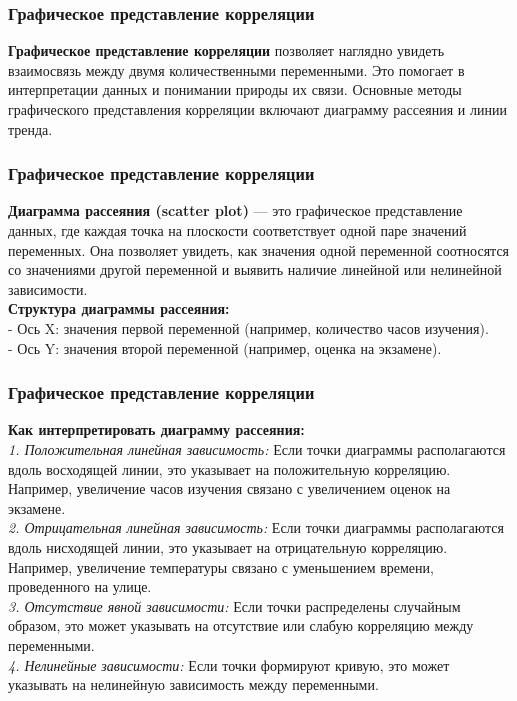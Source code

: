 \documentclass[aspectratio=169]{beamer}
\begin{document}
\begin{frame}
\frametitle{Графическое представление корреляции}
{\bf Графическое представление корреляции} позволяет наглядно увидеть взаимосвязь между двумя количественными переменными. Это помогает в интерпретации данных и понимании природы их связи. Основные методы графического представления корреляции включают диаграмму рассеяния и линии тренда.
\end{frame}

\begin{frame}
\frametitle{Графическое представление корреляции}
{\bf Диаграмма рассеяния (scatter plot)} — это графическое представление данных, где каждая точка на плоскости соответствует одной паре значений переменных. Она позволяет увидеть, как значения одной переменной соотносятся со значениями другой переменной и выявить наличие линейной или нелинейной зависимости.
\newline\\
{\bf Структура диаграммы рассеяния:}\\
\quad - Ось X: значения первой переменной (например, количество часов изучения).\\
\quad - Ось Y: значения второй переменной (например, оценка на экзамене).
\end{frame}

\begin{frame}
\frametitle{Графическое представление корреляции}
{\bf Как интерпретировать диаграмму рассеяния:}\\
{\it 1. Положительная линейная зависимость:} Если точки диаграммы располагаются вдоль восходящей линии, это указывает на положительную корреляцию. Например, увеличение часов изучения связано с увеличением оценок на экзамене.\\
{\it 2. Отрицательная линейная зависимость:} Если точки диаграммы располагаются вдоль нисходящей линии, это указывает на отрицательную корреляцию. Например, увеличение температуры связано с уменьшением времени, проведенного на улице.\\
{\it 3. Отсутствие явной зависимости:} Если точки распределены случайным образом, это может указывать на отсутствие или слабую корреляцию между переменными.\\
{\it 4. Нелинейные зависимости:} Если точки формируют кривую, это может указывать на нелинейную зависимость между переменными.
\end{frame}
\end{document}
